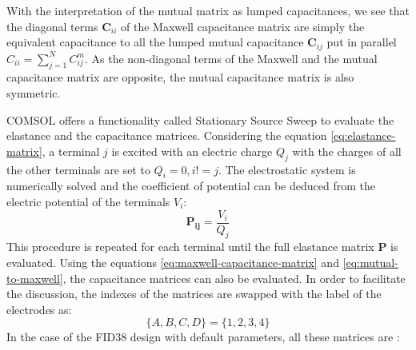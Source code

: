With the interpretation of the mutual matrix as lumped capacitances, we see that the diagonal terms $\bm{C}_{ii}$ of the Maxwell capacitance matrix are simply the equivalent capacitance to all the lumped mutual capacitance $\bm{C}_{ij}$ put in parallel $C_{ii} = \sum_{j=1}^N C_{ij}^m$. As the non-diagonal terms of the Maxwell and the mutual capacitance matrix are opposite, the mutual capacitance matrix is also symmetric.

COMSOL offers a functionality called Stationary Source Sweep to evaluate the elastance and the capacitance matrices. Considering the equation \ref{eq:elastance-matrix}, a terminal $j$ is excited with an electric charge $Q_j$ with the charges of all the other terminals are set to $Q_i=0 , i!=j$. The electrostatic system is numerically solved and the coefficient of potential can be deduced from the electric potential of the terminals $V_i$:
\begin{equation}
\bm{P_{ij}} = \frac{V_i}{Q_j}
\end{equation}
This procedure is repeated for each terminal until the full elastance matrix $\bm{P}$ is evaluated. Using the equations \ref{eq:maxwell-capacitance-matrix} and \ref{eq:mutual-to-maxwell}, the capacitance matrices can also be evaluated. In order to facilitate the discussion, the indexes of the matrices are swapped with the label of the electrodes as: $$\{A,B,C,D\} = \{1,2,3,4\}$$
In the case of the FID38 design with default parameters, all these matrices are :

